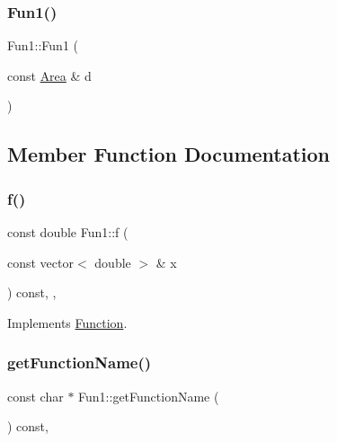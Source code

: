\mbox{\label{class_fun1_a44d0e471ec78e8ad134680de4bec992b}} 
\subsubsection{\texorpdfstring{Fun1()}{Fun1()}\hspace{0.1cm}{\footnotesize\ttfamily [2/2]}}
{\footnotesize\ttfamily Fun1\+::\+Fun1 (\begin{DoxyParamCaption}\item[{const \hyperlink{class_area}{Area} \&}]{d }\end{DoxyParamCaption})}



\subsection{Member Function Documentation}
\mbox{\label{class_fun1_adbd9aa971a649a7b6eda8fb6806a8498}} 
\subsubsection{\texorpdfstring{f()}{f()}}
{\footnotesize\ttfamily const double Fun1\+::f (\begin{DoxyParamCaption}\item[{const vector$<$ double $>$ \&}]{x }\end{DoxyParamCaption}) const\hspace{0.3cm}{\ttfamily [inline]}, {\ttfamily [override]}, {\ttfamily [virtual]}}



Implements \hyperlink{class_function_a81ec299f137e34109246cde88d88c949}{Function}.

\mbox{\label{class_fun1_a94ea2bb4448ebe03753de16d07784ea8}} 
\subsubsection{\texorpdfstring{get\+Function\+Name()}{getFunctionName()}}
{\footnotesize\ttfamily const char $\ast$ Fun1\+::get\+Function\+Name (\begin{DoxyParamCaption}{ }\end{DoxyParamCaption}) const\hspace{0.3cm}{\ttfamily [override]}, {\ttfamily [virtual]}}



